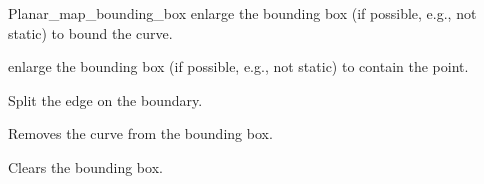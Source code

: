\begin{ccRefConcept}{Planar_map_bounding_box}
\ccModifiers
{}
{enlarge the bounding box (if possible, e.g., not static) to bound the curve.}

{enlarge the bounding box (if possible, e.g., not static) to contain the point.}

{Split the edge on the boundary.}


{Removes the curve from the bounding box.}

{Clears the bounding box.}

\ccHasModels
    \\

\end{ccRefConcept}

\renewcommand{\ccRefPageBegin}{}
\renewcommand{\ccRefPageEnd}{}

\ccRefPageEnd
